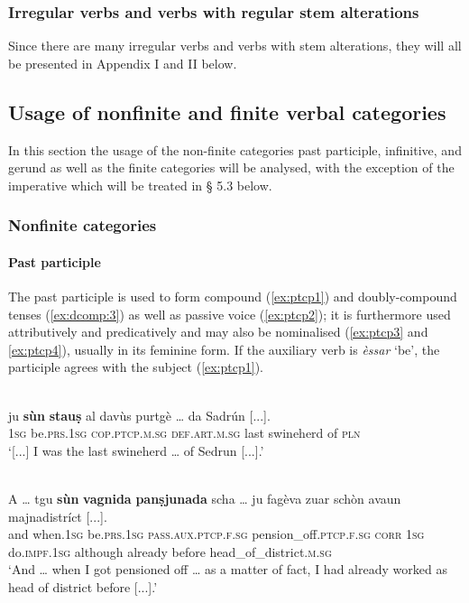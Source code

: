


\subsubsection{Irregular verbs and verbs with regular stem alterations}
Since there are many irregular verbs and verbs with stem alterations, they will all be presented in Appendix I and II below. 

\subsection{Usage of nonfinite and finite verbal categories}
In this section the usage of the non-finite categories past participle, infinitive, and gerund as well as the finite categories will be analysed, with the exception of the imperative which will be treated in § 5.3 below.

\subsubsection{Nonfinite categories}

\paragraph{Past participle}


The past participle is used to form compound (\ref{ex:ptcp1}) and doubly-compound tenses (\ref{ex:dcomp:3}) as well as passive voice (\ref{ex:ptcp2}); it is furthermore used attributively and predicatively and may also be nominalised (\ref{ex:ptcp3} and \ref{ex:ptcp4}), usually in its feminine form. If the auxiliary verb is \textit{èssar} `be', the participle agrees with the subject (\ref{ex:ptcp1}).

\ea
\label{ex:ptcp1}
\\
\gll    [...] ju \textbf{sùn} \textbf{stauṣ} al davùs purtgè … da Sadrún [...].\\
{}  \textsc{1sg} be.\textsc{prs.1sg} \textsc{cop.ptcp.m.sg} \textsc{def.art.m.sg} last swineherd {} of \textsc{pln} \\
\glt `[...] I was the last swineherd … of Sedrun [...].'
\z

\ea\label{ex:ptcp2}
\\
\gll  A … tgu \textbf{sùn} \textbf{vagnida} \textbf{panṣjunada} scha … ju fagèva zuar schòn avaun majnadistríct [...].\\
and {} when.\textsc{1sg} be.\textsc{prs.1sg} \textsc{pass.aux.ptcp.f.sg} pension\_off.\textsc{ptcp.f.sg} \textsc{corr} {} \textsc{1sg} do.\textsc{impf.1sg} although already before head\_of\_district.\textsc{m.sg}\\
\glt `And … when I got pensioned off … as a matter of fact, I had already worked as head of district before [...].'
\z

